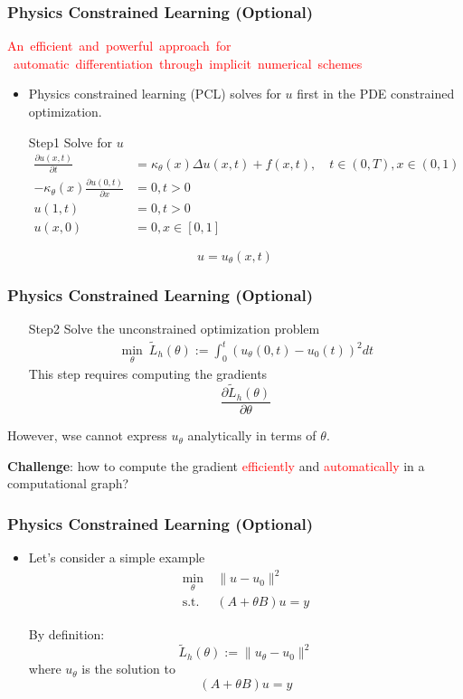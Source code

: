 \documentclass{beamer}
\begin{document}
\begin{frame}
	\frametitle{Physics Constrained Learning (Optional)}
	\begin{center}
\textcolor{red}{\mbox{An efficient and powerful approach for} \\\mbox{ automatic differentiation through implicit numerical schemes}}
	\end{center}
	\begin{itemize}
		\item Physics constrained learning (PCL) solves for $u$ first in the PDE constrained optimization. 
	\end{itemize}
	\begin{itemize}
\item[Step1] Solve for $u$
\begin{align*}
 \frac{\partial u(x, t)}{\partial t} &= {\kappa_\theta(x)}\Delta u(x, t) + f(x, t), \quad t\in (0,T), x\in (0,1) \\
-{\kappa_\theta(x)}\frac{\partial u(0,t)}{\partial x} &= 0, t>0\\
 u(1, t) &= 0, t>0\\
 u(x, 0) &= 0, x\in [0,1]
\end{align*}
	\end{itemize}
	$$\boxed{u = u_\theta(x, t)}$$
\end{frame}


\begin{frame}
	\frametitle{Physics Constrained Learning (Optional)}
	
	\begin{itemize}
\item[Step2] Solve the unconstrained optimization problem
\begin{align*}
 \min_\theta \ \tilde L_h(\theta) := \int_{0}^t ( u_\theta(0, t)- u_0(t))^2 dt
\end{align*} 
This step requires computing the gradients
$$\boxed{\frac{\partial \tilde L_h(\theta)}{\partial \theta}}$$
\end{itemize}

However, wse cannot express $u_\theta$ analytically in terms of $\theta$.

\textbf{Challenge}: how to compute the gradient \textcolor{red}{efficiently} and \textcolor{red}{automatically} in a computational graph?

\end{frame}



\begin{frame}
	\frametitle{Physics Constrained Learning (Optional)}
\begin{itemize}
	\item Let's consider a simple example
	\begin{align*}
		\min_\theta & \ \|u-u_0\|^2\\
		\mathrm{s.t.} & \ (A+\theta B) u = y 
	\end{align*}
	
	By definition:
	$$\tilde L_h(\theta) := \|u_\theta-u_0\|^2$$
	where $u_\theta$ is the solution to 
	$$ (A+\theta B) u = y $$
\end{itemize}	

\end{frame}
\end{document}
